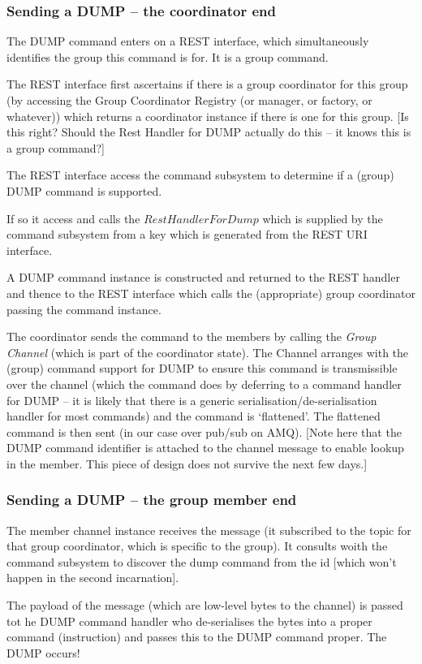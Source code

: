 \documentclass[a4paper,12pt]{article}
\begin{document}
\subsubsection*{Sending a DUMP -- the coordinator end}
The DUMP command enters on a REST interface, which simultaneously identifies the group this command is for. It is a group command. 

The REST interface first ascertains if there is a group coordinator for this group (by accessing the Group Coordinator Registry (or manager, or factory, or whatever)) which returns a coordinator instance if there is one for this group. [Is this right? Should the Rest Handler for DUMP actually do this -- it knows this is a group command?]

The REST interface access the command subsystem to determine if a (group) DUMP command is supported. 

If so it access and calls the $RestHandlerForDump$ which is supplied by the command subsystem from a key which is generated from the REST URI interface.

A DUMP command instance is constructed and returned to the REST handler and thence to the REST interface which calls the (appropriate) group coordinator passing the command instance.

The coordinator sends the command to the members by calling the \emph{Group Channel} (which is part of the coordinator state). The Channel arranges with the (group) command support for DUMP to ensure this command is transmissible over the channel (which the command does by deferring to a command handler for DUMP -- it is likely that there is a generic serialisation/de-serialisation handler for most commands) and the command is `flattened'. The flattened command is then sent (in our case over pub/sub on AMQ). [Note here that the DUMP command identifier is attached to the channel message to enable lookup in the member. This piece of design does not survive the next few days.]
 
\subsubsection*{Sending a DUMP -- the group member end}
The member channel instance receives the message (it subscribed to the topic for that group coordinator, which is specific to the group). It consults woith the command subsystem to discover the dump command from the id [which won't happen in the second incarnation].

The payload of the message (which are low-level bytes to the channel) is passed tot he DUMP command handler who de-serialises the bytes into a proper command (instruction) and passes this to the DUMP command proper. The DUMP occurs!
\end{document}
